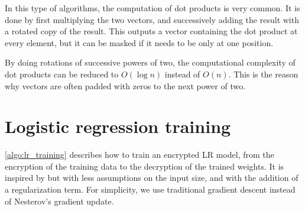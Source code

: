 \documentclass[a4paper,11pt,oneside]{report}
\begin{document}
In this type of algorithms, the computation of dot products is very common. 
It is done by first multiplying the two vectors, and successively adding the result with a rotated copy of the result. 
This outputs a vector containing the dot product at every element, but it can be masked if it needs to be only at one position.

By doing rotations of successive powers of two, the computational complexity of dot products can be reduced to $O(\log n)$ instead of $O(n)$. 
This is the reason why vectors are often padded with zeros to the next power of two.

\section{Logistic regression training}

\autoref{algo:lr_training} describes how to train an encrypted LR model, from the encryption of the training data to the decryption of the trained weights.
It is inspired by \cite{kim_logistic_2018} but with less assumptions on the input size, and with the addition of a regularization term. 
For simplicity, we use traditional gradient descent instead of Nesterov's gradient update.
\end{document}
